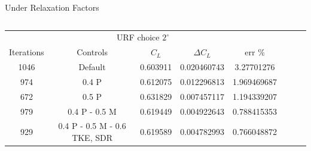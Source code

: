 \documentclass[english,10pt,a4paper,twoside]{beamer}
\newcommand{\ra}[1]{\renewcommand{\arraystretch}{#1}} %
\begin{document}
\begin{frame}[shrink=55]{Under Relaxation Factors}
\begin{columns}[T]
		\begin{table}[H]
			\ra{1.2}
			\centering
\begin{tabular}{|ccccc|lll}
	\cline{1-5}
	\multicolumn{5}{|c|}{URF choice $2^\circ$}                                                                                                                                                                               & \multicolumn{1}{c}{} & \multicolumn{1}{c}{} & \multicolumn{1}{c}{} \\ \cline{1-5}
	\multicolumn{1}{|c|}{Iterations}                  & \multicolumn{1}{c|}{Controls}                              & \multicolumn{1}{c|}{$C_L$}    & \multicolumn{1}{c|}{$\Delta C_L$} & err \%                              &                      &                      &                      \\ \cline{1-5}
	\multicolumn{1}{|c|}{1046}                        & \multicolumn{1}{c|}{Default}                               & \multicolumn{1}{c|}{0.603911} & \multicolumn{1}{c|}{0.020460743}  & 3.27701276                          &                      &                      &                      \\ \cline{1-5}
	\multicolumn{1}{|c|}{\cellcolor[HTML]{9AFF99}974} & \multicolumn{1}{c|}{0.4 P}                                 & \multicolumn{1}{c|}{0.612075} & \multicolumn{1}{c|}{0.012296813}  & 1.969469687                         &                      &                      &                      \\ \cline{1-5}
	\multicolumn{1}{|c|}{\cellcolor[HTML]{34FF34}672} & \multicolumn{1}{c|}{0.5 P}                                 & \multicolumn{1}{c|}{0.631829} & \multicolumn{1}{c|}{0.007457117}  & \cellcolor[HTML]{9AFF99}1.194339207 &                      &                      &                      \\ \cline{1-5}
	\multicolumn{1}{|c|}{979}                         & \multicolumn{1}{c|}{\cellcolor[HTML]{F8FF00}0.4 P - 0.5 M} & \multicolumn{1}{c|}{0.619449} & \multicolumn{1}{c|}{0.004922643}  & \cellcolor[HTML]{67FD9A}0.788415353 &                      &                      &                      \\ \cline{1-5}
	\multicolumn{1}{|c|}{\cellcolor[HTML]{67FD9A}929} & \multicolumn{1}{c|}{0.4 P - 0.5 M - 0.6 TKE, SDR}          & \multicolumn{1}{c|}{0.619589} & \multicolumn{1}{c|}{0.004782993}  & \cellcolor[HTML]{34FF34}0.766048872 &                      &                      &                      \\ \cline{1-5}
\end{tabular}
		\end{table}
		


\end{columns}
\end{frame}
\end{document}
